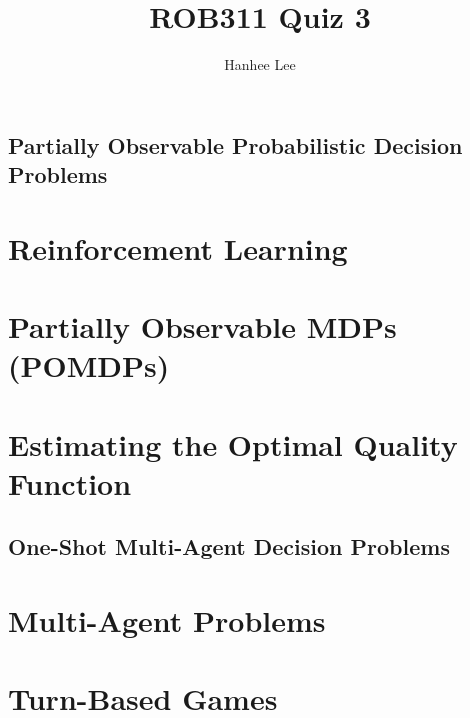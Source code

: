 \documentclass{article}
\title{ROB311 Quiz 3}
\author{Hanhee Lee}
\begin{document}
\maketitle

\tableofcontents
\newpage

\begin{center}
    \section*{Partially Observable Probabilistic Decision Problems}
\end{center}

\section{Reinforcement Learning}

\newpage

\section{Partially Observable MDPs (POMDPs)}

\newpage

\section{Estimating the Optimal Quality Function}

\newpage

\begin{center}
    \section*{One-Shot Multi-Agent Decision Problems}
\end{center}

\section{Multi-Agent Problems}

\newpage

\section{Turn-Based Games}

\newpage
\end{document}
